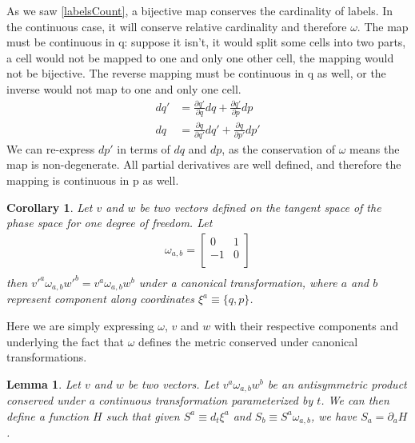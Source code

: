 \documentclass[aps,pra,10pt,twocolumn,floatfix,nofootinbib]{revtex4-1}
\newtheorem{cor}[thm]{Corollary}
\newtheorem{lem}[thm]{Lemma}
\theoremstyle{definition}
\begin{document}
As we saw \ref{labelsCount}, a bijective map conserves the cardinality of labels. In the continuous case, it will conserve relative cardinality and therefore $\omega$. The map must be continuous in q: suppose it isn't, it would split some cells into two parts, a cell would not be mapped to one and only one other cell, the mapping would not be bijective. The reverse mapping must be continuous in q as well, or the inverse would not map to one and only one cell.
\begin{align*}
dq' &= \frac{\partial q'}{\partial q} dq + \frac{\partial q'}{\partial p} dp \\
dq &= \frac{\partial q}{\partial q'} dq' + \frac{\partial q}{\partial p'} dp'
\end{align*}
We can re-express $dp'$ in terms of $dq$ and $dp$, as the conservation of $\omega$ means the map is non-degenerate. All partial derivatives are well defined, and therefore the mapping is continuous in p as well.

\begin{cor}\label{sdofInvariant}
Let $v$ and $w$ be two vectors defined on the tangent space of the phase space for one degree of freedom. Let
\begin{align*}
\omega_{a, b} = \left[
  \begin{array}{cc}
    0 & 1 \\
    -1 & 0 \\
  \end{array}
\right] \\
\end{align*}
then $v'^{a} \omega_{a, b} w'^{b}=v^{a} \omega_{a, b} w^{b}$ under a canonical transformation, where $a$ and $b$ represent component along coordinates $\xi^{a} \equiv \{q,p\}$.
\end{cor}

Here we are simply expressing $\omega$, $v$ and $w$ with their respective components and underlying the fact that $\omega$ defines the metric conserved under canonical transformations.

\begin{lem}\label{genAntisim}
Let $v$ and $w$ be two vectors. Let $v^{a} \omega_{a, b} w^{b}$ be an antisymmetric product conserved under a continuous transformation parameterized by $t$. We can then define a function $H$ such that given $S^{a} \equiv d_{t}\xi^{a}$ and $S_{b} \equiv S^{a} \omega_{a, b}$, we have $S_{a} = \partial_{a}H$.
\end{lem}
\end{document}
